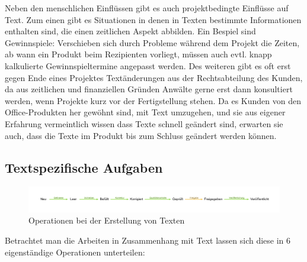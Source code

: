 \documentclass[11pt,a4paper]{article}
\begin{document}
Neben den menschlichen Einflüssen gibt es auch projektbedingte Einflüsse auf Text. Zum einen gibt es Situationen in denen in Texten bestimmte Informationen enthalten sind, die einen zeitlichen Aspekt abbilden. Ein Bespiel sind Gewinnspiele: Verschieben sich durch Probleme während dem Projekt die Zeiten, ab wann ein Produkt beim Rezipienten vorliegt, müssen auch evtl. knapp kalkulierte Gewinnspieltermine angepasst werden. Des weiteren gibt es oft erst gegen Ende eines Projektes Textänderungen aus der Rechtsabteilung des Kunden, da aus zeitlichen und finanziellen Gründen Anwälte gerne erst dann konsultiert werden, wenn Projekte kurz vor der Fertigstellung stehen. Da es Kunden von den Office-Produkten her gewöhnt sind, mit Text umzugehen, und sie aus eigener Erfahrung vermeintlich wissen dass Texte schnell geändert sind, erwarten sie auch, dass die Texte im Produkt bis zum Schluss geändert werden können.

\subsection{Textspezifische Aufgaben}

\begin{figure}[htb]
\begin{center}
\includegraphics[width=\textwidth]{media/chart-3.pdf}
\end{center}
\caption{Operationen bei der Erstellung von Texten}
\label{chart:3}
\end{figure}

Betrachtet man die Arbeiten in Zusammenhang mit Text lassen sich diese in 6 eigenständige Operationen unterteilen:
\end{document}
